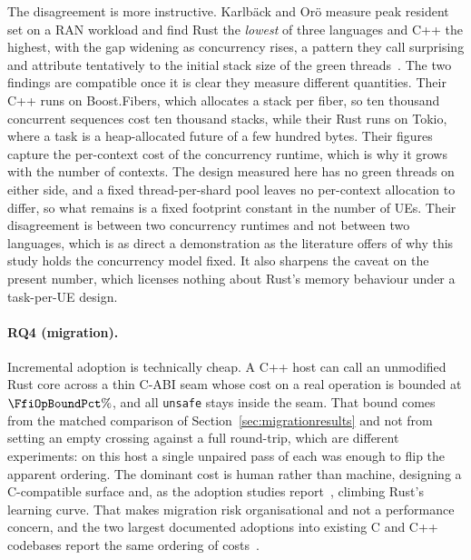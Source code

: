 The disagreement is more instructive. Karlb\"ack and Or\"o measure peak resident set on a RAN
workload and find Rust the \emph{lowest} of three languages and C++ the highest, with the gap
widening as concurrency rises, a pattern they call surprising and attribute tentatively to the
initial stack size of the green threads~\cite{karlback2021ran}. The two findings are compatible
once it is clear they measure different quantities. Their C++ runs on Boost.Fibers, which
allocates a stack per fiber, so ten thousand concurrent sequences cost ten thousand stacks, while
their Rust runs on Tokio, where a task is a heap-allocated future of a few hundred bytes. Their
figures capture the per-context cost of the concurrency runtime, which is why it grows with the
number of contexts. The design measured here has no green threads on either side, and a fixed
thread-per-shard pool leaves no per-context allocation to differ, so what remains is a fixed
footprint constant in the number of UEs. Their disagreement is between two concurrency runtimes
and not between two languages, which is as direct a demonstration as the literature offers of why
this study holds the concurrency model fixed. It also sharpens the caveat on the present number,
which licenses nothing about Rust's memory behaviour under a task-per-UE design.

\paragraph{RQ4 (migration).} Incremental adoption is technically cheap. A C++ host can call an
unmodified Rust core across a thin C-ABI seam whose cost on a real operation is bounded at
$\FfiOpBoundPct\%$, and all \texttt{unsafe} stays inside the seam. That bound comes from the
matched comparison of Section~\ref{sec:migrationresults} and not from setting an empty crossing
against a full round-trip, which are different experiments: on this host a single unpaired pass of
each was enough to flip the apparent ordering. The dominant cost is human rather than machine,
designing a C-compatible surface and, as the adoption studies
report~\cite{fulton2021adopting,crichton2024learning}, climbing Rust's learning curve. That makes
migration risk organisational and not a performance concern, and the two largest documented
adoptions into existing C and C++ codebases report the same ordering of
costs~\cite{li2026rustlinux,fan2026android}.

